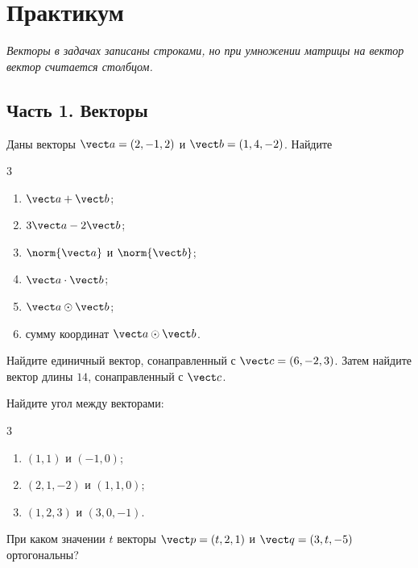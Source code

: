 \newpage
\section*{Практикум}
\textit{Векторы в задачах записаны строками, но при умножении матрицы на вектор вектор считается столбцом.}

\subsection*{Часть 1. Векторы}

\begin{exercise}
Даны векторы $\vect a=(2,-1,2)$ и $\vect b=(1,4,-2)$. Найдите
\begin{multicols}{3}
\begin{enumerate}[label=\asbuk*)]
  \item $\vect a+\vect b$;
  \item $3\vect a-2\vect b$;
  \item $\norm{\vect a}$ и $\norm{\vect b}$;
  \item $\vect a\cdot\vect b$;
  \item $\vect a\odot\vect b$;
  \item сумму координат $\vect a\odot\vect b$.
\end{enumerate}
\end{multicols}
\end{exercise}

\begin{exercise}
Найдите единичный вектор, сонаправленный с $\vect c=(6,-2,3)$. Затем найдите вектор длины $14$, сонаправленный с $\vect c$.
\end{exercise}

\begin{exercise}
Найдите угол между векторами:
\begin{multicols}{3}
\begin{enumerate}[label=\asbuk*)]
  \item $(1,1)$ и $(-1,0)$;
  \item $(2,1,-2)$ и $(1,1,0)$;
  \item $(1,2,3)$ и $(3,0,-1)$.
\end{enumerate}
\end{multicols}
\end{exercise}

\begin{exercise}
При каком значении $t$ векторы $\vect p=(t,2,1)$ и $\vect q=(3,t,-5)$ ортогональны?
\end{exercise}

